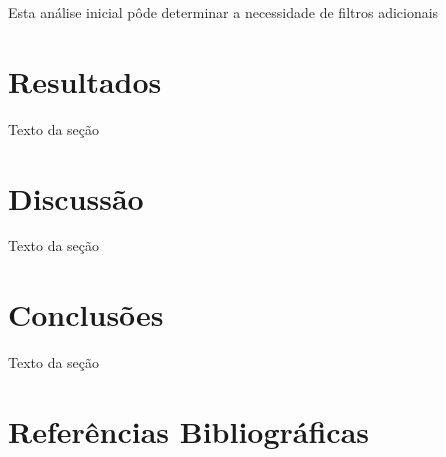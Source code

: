 \documentclass[conference]{IEEEtran}
\begin{document}
Esta análise inicial pôde determinar a necessidade de filtros adicionais


\section{Resultados}
Texto da seção

\section{Discussão}
Texto da seção

\section{Conclusões}
Texto da seção

\section*{Referências Bibliográficas}
\end{document}
